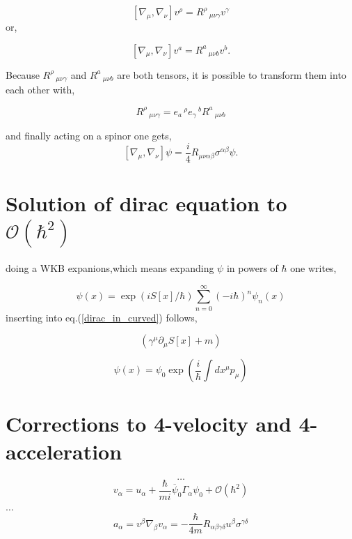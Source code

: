 \documentclass[12pt,a4paper]{article}
\begin{document}
	$$
	[\nabla_\mu, \nabla_\nu]v^\rho =  R^\rho\,_{\mu \nu \gamma } v^\gamma
	$$
	or,
	
	$$
	[\nabla_\mu, \nabla_\nu]v^a =  R^a\,_{\mu \nu b } v^b.
	$$
	
	Because $R^\rho\,_{\mu \nu \gamma }$ and $R^a\,_{\mu \nu b }$ are both tensors, it is possible to transform them into each other with,
	
	$$
	R^\rho\,_{\mu \nu \gamma } = e_a\,^\rho e_\gamma\,^b R^a\,_{\mu \nu b }
	$$
	
	and finally acting on a spinor one gets,
	$$
	[\nabla_\mu, \nabla_\nu]\psi = \frac{i}{4} R_{\mu \nu \alpha \beta} \sigma^{\alpha \beta} \psi.
	$$
	
	
	
	\section{Solution of dirac equation to $\mathcal{O} (\hbar^2)$}
	doing a WKB expanions,which means expanding $\psi$ in powers of $\hbar$ one writes,
	
	\begin{equation}
		\psi(x) = \exp(i S[x]/\hbar) \sum_{n=0}^{\infty}(-i\hbar)^n \psi_n(x)
	\end{equation}
	inserting into eq.(\ref{dirac_in_curved})
	follows,
	
	\begin{equation}
		\left(\gamma^\mu \partial_\mu S[x] + m \right)
	\end{equation}
	
	
	\begin{equation}
		\label{solution_to_diraceq}
		\psi(x) = \psi_0 \exp\left(\frac{i}{\hbar}\int dx^\mu p_\mu\right)
	\end{equation}
	\section{Corrections to 4-velocity and 4-acceleration}
	$$
	\ldots
	$$
	\begin{equation}
		\label{correction_to_v}
		v_\alpha = u_\alpha + \frac{\hbar}{mi}\overbar{\psi}_0 \Gamma_\alpha \psi_0 +\mathcal{O} (\hbar^2)
	\end{equation}
	$\ldots$
	\begin{equation}
		\label{correction_to_a}
		a_\alpha = v^\beta \nabla_\beta v_\alpha =  -\frac{\hbar}{4m} R_{\alpha \beta \gamma \delta}u^\beta \sigma^{\gamma \delta}
	\end{equation}
	
\end{document}
